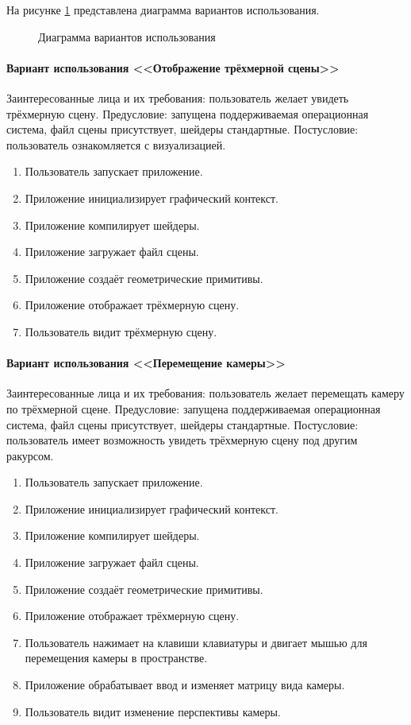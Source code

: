 На рисунке \ref{usecase:image} представлена диаграмма вариантов использования.

\begin{figure}[ht]
\caption{Диаграмма вариантов использования}
\label{usecase:image}
\end{figure}

\paragraph{Вариант использования <<Отображение трёхмерной сцены>>}

Заинтересованные лица и их требования: пользователь желает увидеть трёхмерную сцену. Предусловие: запущена поддерживаемая операционная система, файл сцены присутствует, шейдеры стандартные. Постусловие: пользователь ознакомляется с визуализацией.

\begin{enumerate}
    \item Пользователь запускает приложение.
    \item Приложение инициализирует графический контекст.
    \item Приложение компилирует шейдеры.
    \item Приложение загружает файл сцены.
    \item Приложение создаёт геометрические примитивы.
    \item Приложение отображает трёхмерную сцену.
    \item Пользователь видит трёхмерную сцену.
\end{enumerate}

\paragraph{Вариант использования <<Перемещение камеры>>}

Заинтересованные лица и их требования: пользователь желает перемещать камеру по трёхмерной сцене. Предусловие: запущена поддерживаемая операционная система, файл сцены присутствует, шейдеры стандартные. Постусловие: пользователь имеет возможность увидеть трёхмерную сцену под другим ракурсом.

\begin{enumerate}
    \item Пользователь запускает приложение.
    \item Приложение инициализирует графический контекст.
    \item Приложение компилирует шейдеры.
    \item Приложение загружает файл сцены.
    \item Приложение создаёт геометрические примитивы.
    \item Приложение отображает трёхмерную сцену.
    \item Пользователь нажимает на клавиши клавиатуры и двигает мышью для перемещения камеры в пространстве.
    \item Приложение обрабатывает ввод и изменяет матрицу вида камеры.
    \item Пользователь видит изменение перспективы камеры.
\end{enumerate}


